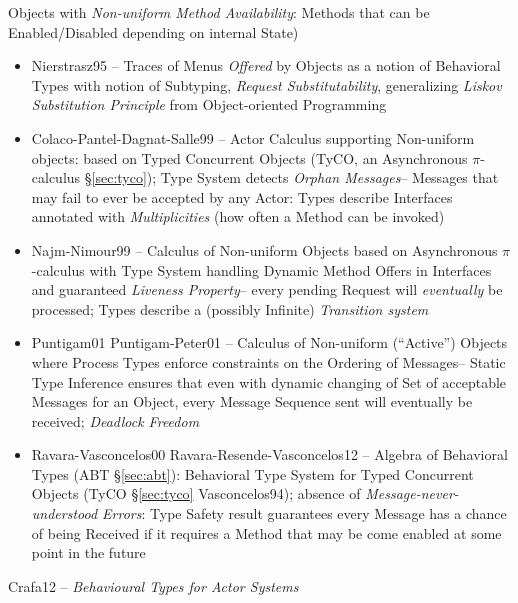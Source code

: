 Objects with \emph{Non-uniform Method Availability}: Methods that can
be Enabled/Disabled depending on internal State)
\begin{itemize}
  \item Nierstrasz95 -- Traces of Menus \emph{Offered} by Objects as a
    notion of Behavioral Types with notion of Subtyping, \emph{Request
      Substitutability}, generalizing \emph{Liskov Substitution
      Principle} from Object-oriented Programming
  \item Colaco-Pantel-Dagnat-Salle99 -- Actor Calculus supporting
    Non-uniform objects: based on Typed Concurrent Objects (TyCO, an
    Asynchronous $\pi$-calculus \S\ref{sec:tyco}); Type System detects
    \emph{Orphan Messages}-- Messages that may fail to ever be
    accepted by any Actor: Types describe Interfaces annotated with
    \emph{Multiplicities} (how often a Method can be invoked)
  \item Najm-Nimour99 -- Calculus of Non-uniform Objects based on
    Asynchronous $\pi$-calculus with Type System handling Dynamic
    Method Offers in Interfaces and guaranteed \emph{Liveness
      Property}-- every pending Request will \emph{eventually} be
    processed; Types describe a (possibly Infinite) \emph{Transition
      system}
  \item Puntigam01 Puntigam-Peter01 -- Calculus of Non-uniform
    (``Active'') Objects where Process Types enforce constraints on
    the Ordering of Messages-- Static Type Inference ensures that even
    with dynamic changing of Set of acceptable Messages for an Object,
    every Message Sequence sent will eventually be received;
    \emph{Deadlock Freedom}
  \item Ravara-Vasconcelos00 Ravara-Resende-Vasconcelos12 -- Algebra
    of Behavioral Types (ABT \S\ref{sec:abt}): Behavioral Type System
    for Typed Concurrent Objects (TyCO \S\ref{sec:tyco} Vasconcelos94);
    absence of \emph{Message-never-understood Errors}: Type Safety
    result guarantees every Message has a chance of being Received if
    it requires a Method that may be come enabled at some point in the
    future
\end{itemize}


\asterism


\begingroup %

\renewcommand{\End}{\mathsf{end}}
\newcommand{\actors}{\mathsf{actors}}
\newcommand{\balanced}{\mathsf{balanced}}
\newcommand{\fullmrk}{\mathsf{fullmrk}}

Crafa12 -- \emph{Behavioural Types for Actor Systems}

